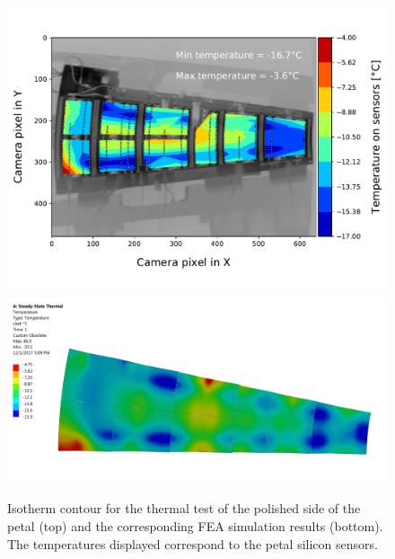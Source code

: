 		\begin{landscape}		
			\begin{figure}
				\centering
				\captionsetup{justification=centering,margin=0cm}
				\includegraphics[scale=0.65]{Figures/Chapter04/thermogram_markers_9_201711271006.pdf}
				\includegraphics[scale=0.045]{Figures/Chapter04/FEA_thermogram_markers_9_201711271006.jpg}
				\caption{Isotherm contour for the thermal test of the polished side of the petal (top) and the corresponding FEA simulation results (bottom). The temperatures displayed correspond to the petal silicon sensors.}\label{fig4.8}
			\end{figure}	
		\end{landscape}	